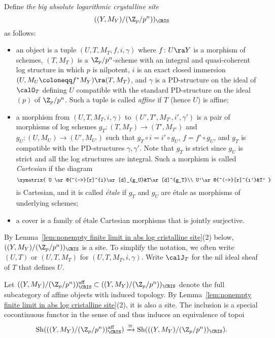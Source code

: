\begin{defn}
Define \emph{the big absolute logarithmic crystalline site} 
\[
((Y,M_Y)/(\Z_p/p^n))_\CRIS
\]
as follows:
\begin{itemize}
    \item an object is a tuple $(U,T,M_T, f, i,\gamma)$ where $f\colon U\ra Y$ is a morphism of schemes, $(T,M_T)$ is a $\Z_p/p^n$-scheme with an integral and quasi-coherent log structure in which $p$ is nilpotent, $i$ is an exact closed immersion $(U,M_U\coloneqq f^\ast M_Y)\ra (T,M_T)$, and $\gamma$ is a PD-structure on the ideal of $\calO_T$ defining $U$ compatible with the standard PD-structure on the ideal $(p)$ of  $\Z_p/p^n$. Such a tuple is called \emph{affine} if $T$ (hence $U$) is affine;
    \item a morphism from $(U,T,M_T,i,\gamma)$ to $(U',T',M_{T'},i',\gamma')$ is a pair of morphisms of log schemes $g_T\colon (T,M_T)\rightarrow (T', M_{T'})$ and $g_U\colon (U,M_U)\rightarrow (U',M_{U'})$ such that $g_T\circ i=i'\circ g_U$, $f=f'\circ g_U$, and $g_T$ is compatible with the PD-structures $\gamma,\gamma'$. Note that $g_T$ is strict since $g_U$ is strict and all the log structures are integral. Such a morphism is called \emph{Cartesian} if the diagram
    \[
    \xymatrix{
    U \ar@{^(->}[r]^{i}\ar[d]_{g_U}&T\ar[d]^{g_T}\\ U'\ar@{^(->}[r]^{i'}&T'
    }
    \]
    is Cartesian, and it is called \emph{\'etale} if $g_T$ and $g_U$ are \'etale as morphisms of underlying schemes;
    \item a cover is a family of \'etale Cartesian morphisms that is jointly surjective.
\end{itemize}
By Lemma~\ref{lem:nonempty finite limit in abs log cristalline site}(2) below, $((Y,M_Y)/(\Z_p/p^n))_\CRIS$ is a site. 
To simplify the notation, we often write $(U,T)$ or $(U,T,M_T)$ for $(U,T,M_T,i,\gamma)$. Write $\calJ_T$ for the nil ideal sheaf of $T$ that defines $U$. 

Let $((Y,M_Y)/(\Z_p/p^n))_{\CRIS}^{\mathrm{aff}}\subset ((Y,M_Y)/(\Z_p/p^n))_\CRIS$ denote the full subcategory of affine objects with induced topology. By Lemma~\ref{lem:nonempty finite limit in abs log cristalline site}(2), it is also a site. The inclusion is a special cocontinuous functor in the sense of \cite[Tag~03CG]{stacks-project} and thus induces an equivalence of topoi 
\[
\operatorname{Sh}(((Y,M_Y)/(\Z_p/p^n))_{\CRIS}^{\mathrm{aff}})\xrightarrow{\cong} \operatorname{Sh}(((Y,M_Y)/(\Z_p/p^n))_\CRIS).
\]
\end{defn}

